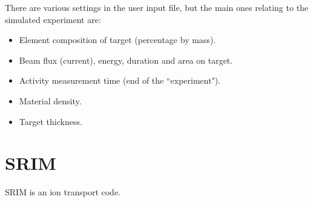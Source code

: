 There are various settings in the user input file, but the main ones relating to the simulated experiment are:

\begin{itemize}
	\item Element composition of target (percentage by mass).
	\item Beam flux (current), energy, duration and area on target.
	\item Activity measurement time (end of the ``experiment").
	\item Material density.
	\item Target thickness.
\end{itemize}




\section{SRIM}

SRIM is an ion transport code.  








